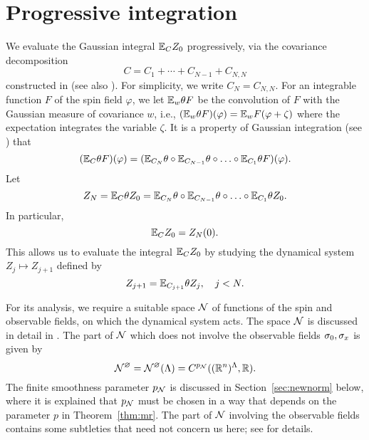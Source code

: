 
\section{Progressive integration}
\label{sec:prog}

We evaluate the Gaussian integral $\mathbb{E}_C Z_0$ progressively, via
the covariance decomposition
\begin{equation}
\label{e:NCj}
C = C_1 + \cdots + C_{N-1} + C_{N,N}
\end{equation}
constructed in \cite{Baue13a} (see also \cite{BGM04}). For simplicity, we write $C_N = C_{N,N}$.
For an integrable function $F$ of the spin field $\varphi$, we let
$\mathbb{E}_{w}\theta F$ be the convolution of $F$ with the Gaussian measure of covariance $w$, i.e.,
$(\mathbb{E}_w\theta F)(\varphi) = \mathbb{E}_wF(\varphi + \zeta)$ where the expectation integrates the
variable $\zeta$.
It is a property of Gaussian integration (see \cite{BS-rg-norm}) that
\begin{equation}
    (\mathbb{E}_C \theta F)(\varphi)
    =
    (\mathbb{E}_{C_N}\theta \circ \mathbb{E}_{C_{N-1}}\theta \circ \ldots \circ \mathbb{E}_{C_1}\theta F)
    (\varphi).
\end{equation}
Let
\begin{equation}
\label{e:ZNdef}
Z_N = \mathbb{E}_C \theta Z_0
=
\mathbb{E}_{C_N}\theta \circ \mathbb{E}_{C_{N-1}}\theta \circ \ldots \circ \mathbb{E}_{C_1}\theta Z_0.
\end{equation}
In particular,
\begin{equation}
\mathbb{E}_C Z_0 = Z_N(0).
\end{equation}
This allows us to evaluate the integral $\mathbb{E}_C Z_0$ by studying the
dynamical system $Z_j \mapsto Z_{j+1}$ defined by
\begin{equation}
Z_{j+1} = \mathbb{E}_{C_{j+1}} \theta Z_j, \quad j < N.
\end{equation}

For its analysis, we require
a suitable space $\mathcal{N}$ of functions of the spin
and observable fields, on which the dynamical system acts.  The space $\mathcal{N}$ is
discussed in detail in \cite[Section~\ref{phi4-sec:phi4observables_representation}]{ST-phi4}.
The part of $\mathcal{N}$ which does not involve the observable fields $\sigma_0,\sigma_x$ is
given by
\begin{equation}
\label{e:Ncaldef}
    \mathcal{N}^\varnothing = \mathcal{N}^\varnothing(\Lambda) = C^{p_{\mathcal{N}}}(({\mathbb R}^n)^\Lambda,{\mathbb R}).
\end{equation}
The finite smoothness parameter $p_{\mathcal{N}}$ is discussed in Section~\ref{sec:newnorm}
below,
where it is explained that $p_{\mathcal{N}}$ must be chosen in a way that depends on the
parameter $p$ in Theorem~\ref{thm:mr}.
The part of $\mathcal{N}$ involving the observable fields contains some subtleties that
need not concern us here; see \cite[Section~\ref{phi4-sec:phi4observables_representation}]{ST-phi4}
for details.

